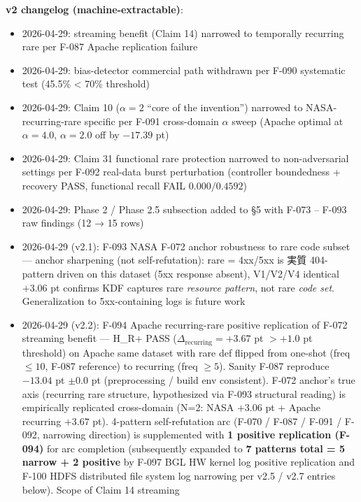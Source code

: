 \textbf{v2 changelog (machine-extractable)}:

\begin{itemize}
\tightlist
\item
  2026-04-29: streaming benefit (Claim 14) narrowed to temporally
  recurring rare per F-087 Apache replication failure
\item
  2026-04-29: bias-detector commercial path withdrawn per F-090
  systematic test (45.5\% \textless{} 70\% threshold)
\item
  2026-04-29: Claim 10 (\(\alpha=2\) ``core of the invention'') narrowed
  to NASA-recurring-rare specific per F-091 cross-domain \(\alpha\) sweep
  (Apache optimal at \(\alpha=4.0\), \(\alpha=2.0\) off by \(-17.39\) pt)
\item
  2026-04-29: Claim 31 functional rare protection narrowed to
  non-adversarial settings per F-092 real-data burst perturbation
  (controller boundedness + recovery PASS, functional recall FAIL
  \(0.000 / 0.4592\))
\item
  2026-04-29: Phase 2 / Phase 2.5 subsection added to §5 with
  F-073 -- F-093 raw findings (12 → 15 rows)
\item
  2026-04-29 (v2.1): F-093 NASA F-072 anchor robustness to rare code
  subset --- anchor sharpening (not self-refutation): rare = 4xx/5xx is
  実質 404-pattern driven on this dataset (5xx response absent), V1/V2/V4
  identical \(+3.06\) pt confirms KDF captures rare \emph{resource pattern},
  not rare \emph{code set}. Generalization to 5xx-containing logs is future
  work
\item
  2026-04-29 (v2.2): F-094 Apache recurring-rare positive replication
  of F-072 streaming benefit --- H\_R+ PASS (\(\Delta_{\text{recurring}} =
  +3.67\) pt \(> +1.0\) pt threshold) on Apache same dataset with rare def
  flipped from one-shot (freq \(\le 10\), F-087 reference) to recurring
  (freq \(\ge 5\)). Sanity F-087 reproduce \(-13.04\) pt \(\pm 0.0\) pt
  (preprocessing / build env consistent). F-072 anchor's true axis
  (recurring rare structure, hypothesized via F-093 structural reading)
  is empirically replicated cross-domain (N=2: NASA \(+3.06\) pt + Apache
  recurring \(+3.67\) pt). 4-pattern self-refutation arc (F-070 / F-087 /
  F-091 / F-092, narrowing direction) is supplemented with \textbf{1 positive
  replication (F-094)} for arc completion (subsequently expanded to
  \textbf{7 patterns total = 5 narrow + 2 positive} by F-097 BGL HW kernel
  log positive replication and F-100 HDFS distributed file system log
  narrowing per v2.5 / v2.7 entries below). Scope of Claim 14 streaming

\end{itemize}
